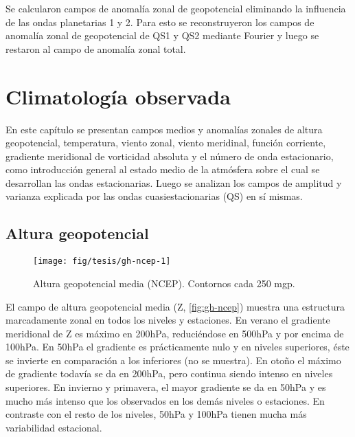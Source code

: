 \documentclass[spanish,a4paper,12pt]{book}
\begin{document}
Se calcularon campos de anomalía zonal de geopotencial eliminando la
influencia de las ondas planetarias 1 y 2. Para esto se reconstruyeron
los campos de anomalía zonal de geopotencial de QS1 y QS2 mediante
Fourier y luego se restaron al campo de anomalía zonal total.

\chapter{Climatología observada}\label{climatologia-observada}

En este capítulo se presentan campos medios y anomalías zonales de
altura geopotencial, temperatura, viento zonal, viento meridinal,
función corriente, gradiente meridional de vorticidad absoluta y el
número de onda estacionario, como introducción general al estado medio
de la atmósfera sobre el cual se desarrollan las ondas estacionarias.
Luego se analizan los campos de amplitud y varianza explicada por las
ondas cuasiestacionarias (QS) en sí mismas.

\section{Altura geopotencial}\label{altura-geopotencial}

\begin{landscape}\begin{figure}

{\centering \texttt{[image: fig/tesis/gh-ncep-1]} 

}

\caption{Altura geopotencial media (NCEP). Contornos cada 250 mgp.}\label{fig:gh-ncep}
\end{figure}
\end{landscape}

El campo de altura geopotencial media (Z, \autoref{fig:gh-ncep}) muestra
una estructura marcadamente zonal en todos los niveles y estaciones. En
verano el gradiente meridional de Z es máximo en 200hPa, reduciéndose en
500hPa y por encima de 100hPa. En 50hPa el gradiente es prácticamente
nulo y en niveles superiores, éste se invierte en comparación a los
inferiores (no se muestra). En otoño el máximo de gradiente todavía se
da en 200hPa, pero continua siendo intenso en niveles superiores. En
invierno y primavera, el mayor gradiente se da en 50hPa y es mucho más
intenso que los observados en los demás niveles o estaciones. En
contraste con el resto de los niveles, 50hPa y 100hPa tienen mucha más
variabilidad estacional.
\end{document}
